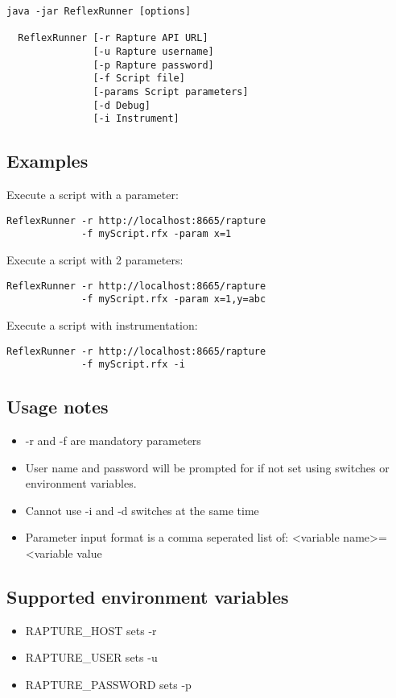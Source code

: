 \begin{Verbatim}[fontsize=\small]
  java -jar ReflexRunner [options]

  ReflexRunner [-r Rapture API URL]
               [-u Rapture username]
               [-p Rapture password]
               [-f Script file]
               [-params Script parameters]
               [-d Debug]
               [-i Instrument]
\end{Verbatim}

\subsection{Examples}

Execute a script with a parameter:
\begin{Verbatim}
ReflexRunner -r http://localhost:8665/rapture
             -f myScript.rfx -param x=1
\end{Verbatim}
Execute a script with 2 parameters:
\begin{Verbatim}
ReflexRunner -r http://localhost:8665/rapture
             -f myScript.rfx -param x=1,y=abc
\end{Verbatim}
Execute a script with instrumentation:
\begin{Verbatim}
ReflexRunner -r http://localhost:8665/rapture
             -f myScript.rfx -i
\end{Verbatim}

\subsection{Usage notes}
\begin{itemize}
\item{-r and -f are mandatory parameters}
\item{User name and password will be prompted for if not set using switches or environment variables.}
\item{Cannot use -i and -d switches at the same time}
\item{Parameter input format is a comma seperated list of: <variable name>=<variable value}
\end{itemize}

\subsection{Supported environment variables}
\begin{itemize}
\item{RAPTURE\_HOST sets -r}
\item{RAPTURE\_USER sets -u}
\item{RAPTURE\_PASSWORD sets -p}
\end{itemize}

